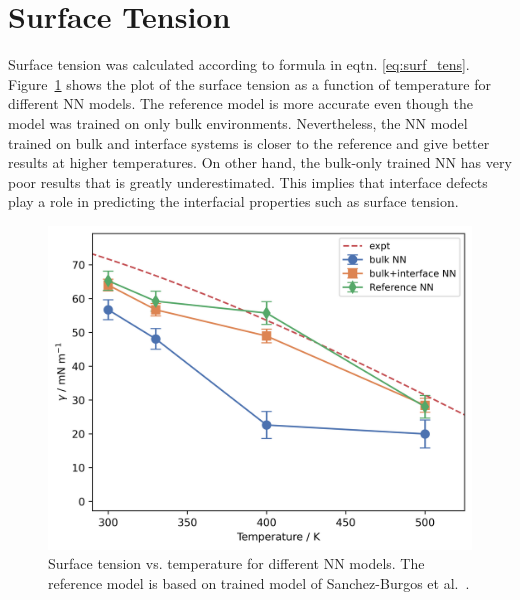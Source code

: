 \section{Surface Tension}
Surface tension was calculated according to formula in eqtn.
\eqref{eq:surf_tens}. Figure~\ref{fig:surf_tens} shows the plot of the surface
tension as a function of temperature for different NN models. The reference
model is more accurate even though the model was trained on only bulk
environments. Nevertheless, the NN model trained on bulk and interface systems
is closer to the reference and give better results at higher temperatures. On
other hand, the bulk-only trained NN has very poor results that is greatly
underestimated. This implies that interface defects play a role in predicting
the interfacial
properties such as surface tension.

\begin{figure}[h!]
  \centering
  \includegraphics[width=0.7\linewidth]{images/surface_tension.png}
  \caption{Surface tension vs. temperature for different NN models. The
    reference model is based on trained model of Sanchez-Burgos et
    al.~\cite{sanchez2023deep}.  }
  \label{fig:surf_tens}
\end{figure}

